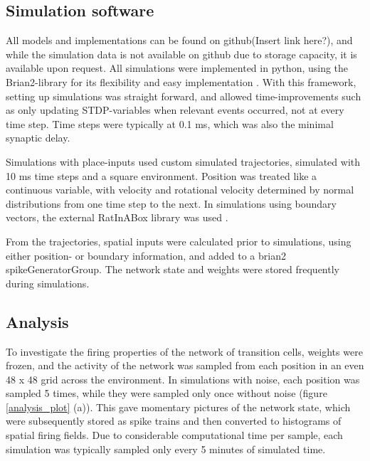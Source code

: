 \documentclass{article}
\begin{document}
    \subsection{Simulation software} \label{Sim software}
    
    All models and implementations can be found on github(Insert link here?), and while the simulation data is not available on github due to storage capacity, it is available upon request. All simulations were implemented in python, using the Brian2-library for its flexibility and easy implementation \parencite{Brian2}. With this framework, setting up simulations was straight forward, and allowed time-improvements such as only updating STDP-variables when relevant events occurred, not at every time step. Time steps were typically at 0.1 ms, which was also the minimal synaptic delay.
    
    Simulations with place-inputs used custom simulated trajectories, simulated with 10 ms time steps and a square environment. Position was treated like a continuous variable, with velocity and rotational velocity determined by normal distributions from one time step to the next. In simulations using boundary vectors, the external RatInABox library was used \parencite{RatInABox}. 
    
    From the trajectories, spatial inputs were calculated prior to simulations, using either position- or boundary information, and added to a brian2 spikeGeneratorGroup. The network state and weights were stored frequently during simulations.

    \subsection{Analysis} \label{Analysis}
    To investigate the firing properties of the network of transition cells, weights were frozen, and the activity of the network was sampled from each position in an even 48 x 48 grid across the environment. In simulations with noise, each position was sampled 5 times, while they were sampled only once without noise (figure \ref{analysis_plot} (a)). This gave momentary pictures of the network state, which were subsequently stored as spike trains and then converted to histograms of spatial firing fields. Due to considerable computational time per sample, each simulation was typically sampled only every 5 minutes of simulated time.
\end{document}
